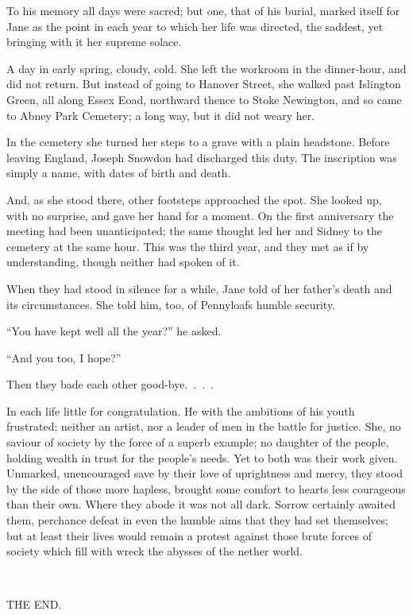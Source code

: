 To his memory all days were sacred; but one, that of his burial, marked
itself for Jane as the point in each year to which her life was
directed, the saddest, yet bringing with it her supreme solace.

A day in early spring, cloudy, cold. She left the workroom in the
dinner-hour, and did not return. But instead of going to Hanover Street,
she walked past Islington Green, all {}along Essex Eoad, northward
thence to Stoke Newington, and so came to Abney Park Cemetery; a long
way, but it did not weary her.

In the cemetery she turned her steps to a grave with a plain headstone.
Before leaving England, Joseph Snowdon had discharged this duty. The
inscription was simply a name, with dates of birth and death.

And, as she stood there, other footsteps approached the spot. She looked
up, with no surprise, and gave her hand for a moment. On the first
anniversary the meeting had been unanticipated; the same thought led her
and Sidney to the cemetery at the same hour. This was the third year,
and they met as if by understanding, though neither had spoken of it.

When they had stood in silence for a while, Jane told of her father's
death and its circumstances. She told him, too, of Pennyloafs humble
security.

``You have kept well all the year?'' he asked.

``And you too, I hope?''

Then they bade each other good-bye{.~.~.~.}

In each life little for congratulation. He {}with the ambitions of his
youth frustrated; neither an artist, nor a leader of men in the battle
for justice. She, no saviour of society by the force of a superb
example; no daughter of the people, holding wealth in trust for the
people's needs. Yet to both was their work given. Unmarked, unencouraged
save by their love of uprightness and mercy, they stood by the side of
those more hapless, brought some comfort to hearts less courageous than
their own. Where they abode it was not all dark. Sorrow certainly
awaited them, perchance defeat in even the humble aims that they had set
themselves; but at least their lives would remain a protest against
those brute forces of society which fill with wreck the abysses of the
nether world.

~

THE END.
